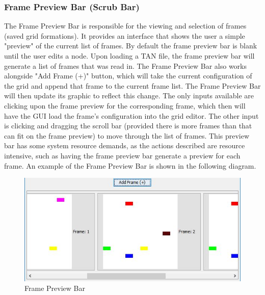 \documentclass[12pt]{article}
\begin{document}
	\subsubsection {Frame Preview Bar (Scrub Bar)}
	The Frame Preview Bar is responsible for the viewing and selection of frames (saved grid formations). It provides an interface that shows the user a simple "preview" of the current list of frames. By default the frame preview bar is blank until the user edits a node. Upon loading a TAN file, the frame preview bar will generate a list of frames that was read in. The Frame Preview Bar also works alongside "Add Frame (+)" button, which will take the current configuration of the grid and append that frame to the current frame list. The Frame Preview Bar will then update its graphic to reflect this change. The only inputs available are clicking upon the frame preview for the corresponding frame, which then will have the GUI load the frame's configuration into the grid editor. The other input is clicking and dragging the scroll bar (provided there is more frames than that can fit on the frame preview) to move through the list of frames. This preview bar has some system resource demands, as the actions described are resource intensive, such as having the frame preview bar generate a preview for each frame. An example of the Frame Preview Bar is shown in the following diagram.
	
	\begin{figure}[ht!]
		\centering
		\includegraphics[width=150mm]{potoFramePre.JPG}
		\caption{Frame Preview Bar}
	\end{figure}

	
\end{document}
